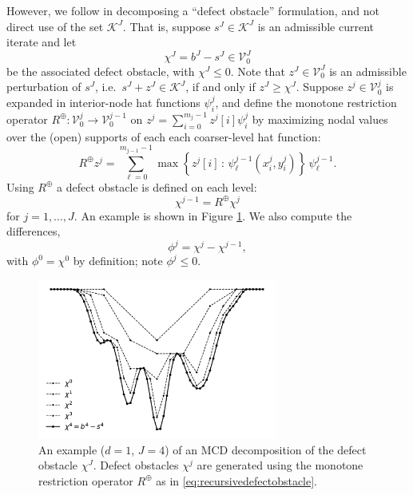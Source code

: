 \documentclass[letterpaper,final,12pt,reqno]{amsart}
\theoremstyle{claim}
\newcommand{\mR}{R^{\bm{\oplus}}}
\numberwithin{equation}{section}
\numberwithin{figure}{section}
\numberwithin{table}{section}
\numberwithin{theorem}{section}
\begin{document}
However, we follow \cite{GraeserKornhuber2009} in decomposing a ``defect obstacle'' formulation, and not direct use of the set $\mathcal{K}^J$.  That is, suppose $s^J \in \mathcal{K}^J$ is an admissible current iterate and let
\begin{equation}
\chi^J = b^J - s^J \in \mathcal{V}_0^J \label{eq:finedefectobstacle}
\end{equation}
be the associated defect obstacle, with $\chi^J \le 0$.  Note that $z^J \in \mathcal{V}_0^J$ is an admissible perturbation of $s^J$, i.e.~$s^J+z^J \in \mathcal{K}^J$, if and only if $z^J \ge \chi^J$.  Suppose $z^j \in \mathcal{V}_0^j$ is expanded in interior-node hat functions $\psi_i^j$, and define the monotone restriction operator $\mR : \mathcal{V}_0^j \to \mathcal{V}_0^{j-1}$ \cite{GraeserKornhuber2009} on $z^j = \sum_{i=0}^{m_j-1} z^j[i] \psi_i^j$ by maximizing nodal values over the (open) supports of each each coarser-level hat function:
\begin{equation}
\mR z^j = \sum_{\ell=0}^{m_{j-1}-1} \max\left\{z^j[i] \,:\,\psi_\ell^{j-1}(x_i^j,y_i^j) \right\}\,\psi_\ell^{j-1}.  \label{eq:monotonerestriction}
\end{equation}
Using $\mR$ a defect obstacle is defined on each level:
\begin{equation}
\chi^{j-1} = \mR \chi^j  \label{eq:recursivedefectobstacle}
\end{equation}
for $j=1,\dots,J$.  An example is shown in Figure \ref{fig:decompclassical}.  We also compute the differences,
\begin{equation}
\phi^j = \chi^j - \chi^{j-1},  \label{eq:downobstacles}
\end{equation}
with $\phi^0=\chi^0$ by definition; note $\phi^j\le 0$.

\begin{figure}[t]
\begin{center}
\includegraphics[width=0.7\textwidth]{fixfigs/decompclassical.pdf}
\end{center}
\caption{An example ($d=1$, $J=4$) of an MCD decomposition of the defect obstacle $\chi^J$.  Defect obstacles $\chi^j$ are generated using the monotone restriction operator $\mR$ as in \eqref{eq:recursivedefectobstacle}.}
\label{fig:decompclassical}
\end{figure}
\end{document}
